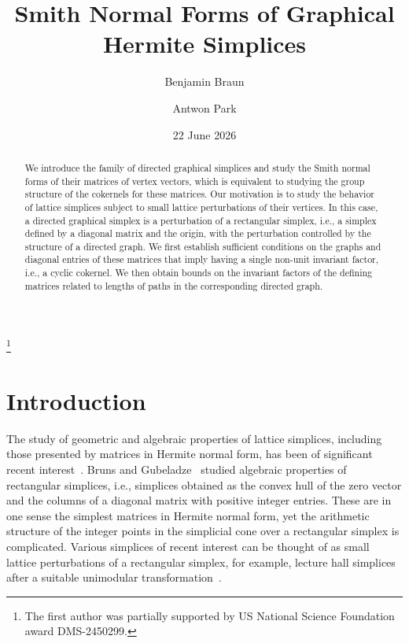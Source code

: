 \documentclass[12pt]{amsart}
\title[Smith Normal Forms of Graphical Hermite Simplices]{Smith Normal Forms of Graphical Hermite Simplices}
\author[B.~Braun]{Benjamin Braun}
\author[A.~Park]{Antwon Park}
\date{22 June 2026}
\theoremstyle{definition}
\numberwithin{equation}{section}
\renewcommand\>{\rangle}
\newcommand\<{\langle}
\newcommand\0{\mathbf{0}}
\begin{document}
\begin{abstract}
We introduce the family of directed graphical simplices and study the Smith normal forms of their matrices of vertex vectors, which is equivalent to studying the group structure of the cokernels for these matrices.
Our motivation is to study the behavior of lattice simplices subject to small lattice perturbations of their vertices.
In this case, a directed graphical simplex is a perturbation of a rectangular simplex, i.e., a simplex defined by a diagonal matrix and the origin, with the perturbation controlled by the structure of a directed graph.
We first establish sufficient conditions on the graphs and diagonal entries of these matrices that imply having a single non-unit invariant factor, i.e., a cyclic cokernel.
We then obtain bounds on the invariant factors of the defining matrices related to lengths of paths in the corresponding directed graph.
\end{abstract}

\thanks{The first author was partially supported by US National Science Foundation award DMS-2450299.}

\maketitle

\section{Introduction}
\label{sec:introduction}

The study of geometric and algebraic properties of lattice simplices, including those presented by matrices in Hermite normal form, has been of significant recent interest~\cite{abendschymura,localhstarpaper,LaplacianSimplicesDigraphs,triangulationslecturehall,braundavisanti,BraunDavisReflexive,braundavishanelylanesolus,
	BraunDavisSolusIDP,braunhanely,BraunLiu,braunolsenehrhartlimits,rectsimppaper,hibihermite,selfdualreflexivesimplices,gorensteinproperties,gorensteingivendelta,
	higashitanicounterexamples,
	higashitaniprime,
	higashitanisimplicesmaxdimension,
	universalsimplices,
	SolusNumeralSystems,tsuchiyagorenstein}.
Bruns and Gubeladze~\cite{rectsimppaper} studied algebraic properties of rectangular simplices, i.e., simplices obtained as the convex hull of the zero vector and the columns of a diagonal matrix with positive integer entries.
These are in one sense the simplest matrices in Hermite normal form, yet the arithmetic structure of the integer points in the simplicial cone over a rectangular simplex is complicated.
Various simplices of recent interest can be thought of as small lattice perturbations of a rectangular simplex, for example, lecture hall simplices after a suitable unimodular transformation~\cite[Section 3]{triangulationslecturehall}.
\end{document}
